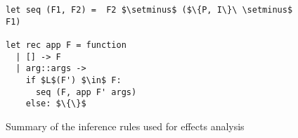 \begin{figure}[H]
\vspace{0.2cm}
 \begin{prooftree}
\end{prooftree} 
\hfill\begin{prooftree}
\end{prooftree}\\

\vspace{0.2cm}
\begin{prooftree}
\end{prooftree}\hfill
\begin{prooftree}
\end{prooftree}\hfill 
\begin{prooftree}
\end{prooftree} \\

\begin{lstlisting}
let seq (F1, F2) =  F2 $\setminus$ ($\{P, I\}\ \setminus$ F1)

let rec app F = function
  | [] -> F
  | arg::args -> 
    if $L$(F') $\in$ F:
      seq (F, app F' args)
    else: $\{\}$
\end{lstlisting}

\caption{Summary of the inference rules used for effects analysis}
\label{fig:inferenceRules}
\end{figure}


